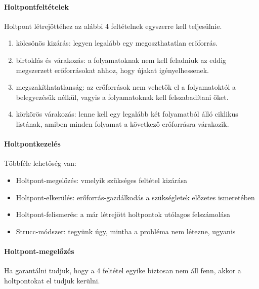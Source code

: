 \documentclass[fleqn,10pt,a4paper]{article}
\newcommand{\listazjromai}{
  \renewcommand{\theenumi}{\roman{enumi}}
  \renewcommand{\labelenumi}{(\theenumi)}
}
\newenvironment{enumzjromai}{\listazjromai\begin{enumerate}}{\end{enumerate}}
\newenvironment{enumzjr}{\begin{enumzjromai}}{\end{enumzjromai}}
\theoremstyle{magyar}
\begin{document}
  \paragraph{Holtpontfeltételek} Holtpont létrejöttéhez az alábbi 4 feltételnek egyszerre kell teljesülnie.
  \begin{enumzjr}
  \item kölcsönös kizárás: legyen legalább egy megoszthatatlan erőforrás.
  \item birtoklás és várakozás: a folyamatoknak nem kell feladniuk az eddig megszerzett erőforrásokat ahhoz, hogy
    újakat igényelhessenek.
  \item megszakíthatatlanság: az erőforrások nem vehetők el a folyamatoktól a belegyezésük nélkül, vagyis a
    folyamatoknak kell felszabadítani őket.
  \item körkörös várakozás: lenne kell egy legalább két folyamatból álló ciklikus listának, amiben minden folyamat a
    következő erőforrásra várakozik.
  \end{enumzjr}
  
  \paragraph{Holtpontkezelés} Többféle lehetőség van:
  \begin{itemize}
  \item Holtpont-megelőzés: vmelyik szükséges feltétel kizárása
  \item Holtpont-elkerülés: erőforrás-gazdálkodás a szükségletek előzetes ismeretében
  \item Holtpont-felismerés: a már létrejött holtpontok utólagos felszámolása
  \item Strucc-módszer: tegyünk úgy, mintha a probléma nem létezne, ugyanis
  \end{itemize}
  
  \paragraph{Holtpont-megelőzés}  Ha garantálni tudjuk, hogy a 4 feltétel egyike biztosan nem áll fenn, akkor a
  holtpontokat el tudjuk kerülni.
  
\end{document}
